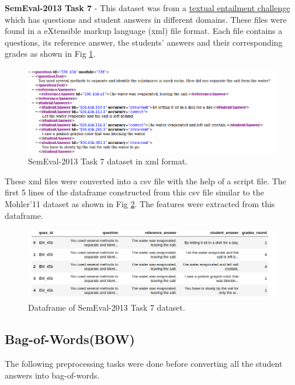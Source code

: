     \textbf{SemEval-2013 Task 7} - This dataset was from a \href{https://www.cs.york.ac.uk/semeval-2013/task7/}{textual entailment challenge} which has questions and student answers in different domains. These files were found in a eXtensible markup language (xml) file format. Each file contains a questions, its reference answer, the students' answers and their corresponding grades as shown in Fig \ref{semeval_xml}. 
    
    \begin{figure}[h]
    	\centering
    	\includegraphics[scale=0.4]{images/semeval_xml}
    	\caption{SemEval-2013 Task 7 dataset in xml format.}
    	\label{semeval_xml}
    \end{figure}
    
    These xml files were converted into a csv file with the help of a script file. The first 5 lines of the dataframe constructed from this csv file similar to the Mohler'11 dataset as shown in Fig \ref{semeval_df}. The features were extracted from this dataframe.
    
    \begin{figure}[h]
    	\centering
    	\includegraphics[scale=0.4]{images/semeval_df}
    	\caption{Dataframe of SemEval-2013 Task 7 dataset.}
    	\label{semeval_df}
    \end{figure} 
    
    \subsection{Bag-of-Words(BOW)}
    
    The following preprocessing tasks were done before converting all the student answers into bag-of-words.
    

